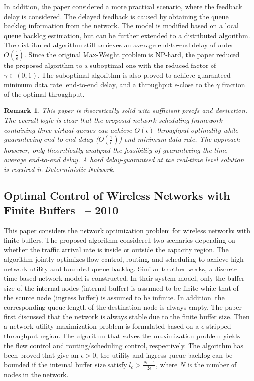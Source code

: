 \documentclass[12pt]{article}
\newtheorem*{remark}{Remark}
\begin{document}
In addition, the paper considered a more practical scenario, where the feedback delay is considered. The delayed feedback is caused by obtaining the queue backlog information from the network. The model is modified based on a local queue backlog estimation, but can be further extended to a distributed algorithm. The distributed algorithm still achieves an average end-to-end delay of order $O(\frac{1}{\epsilon})$. Since the original Max-Weight problem is NP-hard, the paper reduced the proposed algorithm to a suboptimal one with the reduced factor of $\gamma \in (0,1)$. The suboptimal algorithm is also proved to achieve guaranteed minimum data rate, end-to-end delay, and a throughput $\epsilon$-close to the $\gamma$ fraction of the optimal throughput. 

\begin{remark}
This paper is theoretically solid with sufficient proofs and derivation. The overall logic is clear that the proposed network scheduling framework containing three virtual queues can achieve $O(\epsilon)$ throughput optimality while guaranteeing end-to-end delay ($O(\frac{1}{\epsilon})$) and minimum data rate. The approach however, only theoretically analyzed the feasibility of guaranteeing the time average end-to-end delay. A hard delay-guaranteed at the real-time level solution is required in Deterministic Network.
\end{remark}

\subsection{Optimal Control of Wireless Networks with Finite Buffers~\cite{le2010optimal} -- 2010}
This paper considers the network optimization problem for wireless networks with finite buffers. The proposed algorithm considered two scenarios depending on whether the traffic arrival rate is inside or outside the capacity region. The algorithm jointly optimizes flow control, routing, and scheduling to achieve high network utility and bounded queue backlog. Similar to other works, a discrete time-based network model is constructed. In their system model, only the buffer size of the internal nodes (internal buffer) is assumed to be finite while that of the source node (ingress buffer) is assumed to be infinite. In addition, the corresponding queue length of the destination node is always empty. The paper first discussed that the network is always stable due to the finite buffer size. Then a network utility maximization problem is formulated based on a $\epsilon$-stripped throughput region. The algorithm that solves the maximization problem yields the flow control and routing/scheduling control, respectively. The algorithm has been proved that give an $\epsilon >0$, the utility and ingress queue backlog can be bounded if the internal buffer size satisfy $l_c > \frac{N-1}{2\epsilon}$, where $N$ is the number of nodes in the network. 
\end{document}
